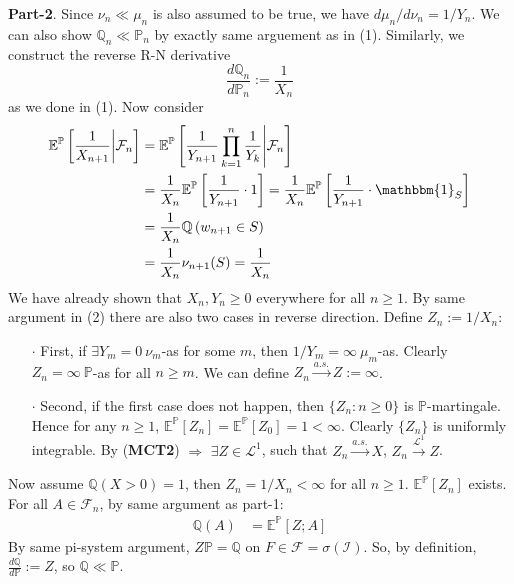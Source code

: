 \documentclass[a4paper,12pt,twoside]{book}
\begin{document}
\begin{itemize}
\begin{itemize}
	\textbf{Part-2}. Since $\nu_n \ll \mu_n$ is also assumed to be true, we have ${d\mu_n}/{d\nu_n}=1/Y_n$.  
	We can also show $\mathbb{Q}_n \ll \mathbb{P}_n$ by exactly same arguement as in (1). Similarly, we construct the reverse R-N derivative
	\begin{equation}
		\frac{d\mathbb{Q}_n}{d\mathbb{P}_n} := \frac{1}{X_n}
	\end{equation} 
	as we done in (1). Now consider
	\begin{equation}
		\begin{split}
			\mathbb{E}^{\mathbb{P}}\left[\frac{1}{X_{n+1}}\middle|\mathcal{F}_n\right]&=\mathbb{E}^{\mathbb{P}}\left[\frac{1}{Y_{n+1}}\prod_{k=1}^n \frac{1}{Y_k}\middle|\mathcal{F}_n\right]\\
			&= \frac{1}{X_n} \mathbb{E}^{\mathbb{P}}\left[\frac{1}{Y_{n+1}}\cdot1\right]=\frac{1}{X_n} \mathbb{E}^{\mathbb{P}}\left[\frac{1}{Y_{n+1}}\cdot \mathbbm{1}_{S}\right]\\
			& = \frac{1}{X_n} \mathbb{Q}\left(w_{n+1}\in S\right) \\
			&= \frac{1}{X_n} \nu_{n+1}(S)=\frac{1}{X_n}
		\end{split}
	\end{equation}
	We have already shown that $X_n, Y_n \geq 0$ everywhere for all $n\geq 1$. By same argument in (2) there are also two cases in reverse direction. Define $Z_n:=1/X_n$:
	\begin{itemize}
		\item[$\cdot$] First, if $\exists Y_m=0~\nu_m$-as for some $m$, then $1/Y_m=\infty~\mu_m$-as. Clearly $Z_n =\infty~\mathbb{P}$-as for all $n\geq m$. We can define $Z_n \xrightarrow{a.s.} Z:=\infty$.
		\item[$\cdot$] Second, if the first case does not happen, then $\{Z_n: n\geq 0\}$ is $\mathbb{P}$-martingale. Hence for any $n\geq1$, $\mathbb{E}^{\mathbb{P}}\left[Z_n\right]=\mathbb{E}^{\mathbb{P}}\left[Z_0\right]=1<\infty$. Clearly $\{Z_n\}$ is uniformly integrable. By (\textbf{MCT2}) $\Rightarrow$ $\exists Z\in \mathcal{L}^1$, such that $Z_n \xrightarrow{a.s.} X$, $Z_n \xrightarrow{\mathcal{L}^1}Z$.
	\end{itemize}
	Now assume $\mathbb{Q}(X>0)=1$, then $Z_n=1/X_n <\infty$ for all $n\geq 1$. $\mathbb{E}^{\mathbb{P}}\left[Z_n\right]$ exists. For all $A\in \mathcal{F}_n$, by same argument as part-1:
	\begin{equation}
		\begin{split}
			\mathbb{Q}(A)&=\mathbb{E}^{\mathbb{P}}\left[Z;A\right]
		\end{split}
	\end{equation}
	By same pi-system argument, $Z\mathbb{P}=\mathbb{Q}$ on $F\in \mathcal{F}=\sigma(\mathcal{I})$.\newline
	So, by definition, $\frac{d\mathbb{Q}}{d \mathbb{P}}:=Z$, so $\mathbb{Q} \ll \mathbb{P}$.\newline


\end{itemize}
\end{itemize}
\end{document}
